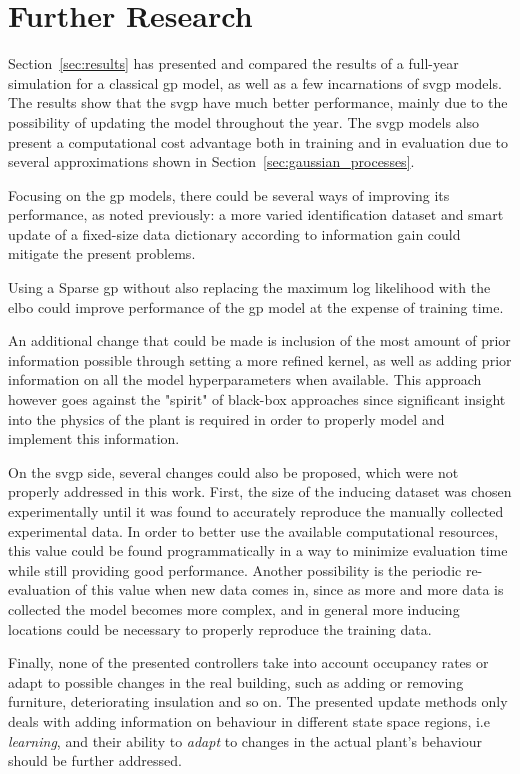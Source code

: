 \section{Further Research}

Section~\ref{sec:results} has presented and compared the results of a full-year
simulation for a classical \acrshort{gp} model, as well as a few incarnations of
\acrshort{svgp} models. The results show that the \acrshort{svgp} have much
better performance, mainly due to the possibility of updating the model
throughout the year. The \acrshort{svgp} models also present a computational
cost advantage both in training and in evaluation due to several approximations
shown in Section~\ref{sec:gaussian_processes}.

Focusing on the \acrlong{gp} models, there could be several ways of improving
its performance, as noted previously: a more varied identification dataset and
smart update of a fixed-size data dictionary according to information gain could
mitigate the present problems.

Using a Sparse \acrshort{gp} without also replacing the maximum log likelihood
with the \acrshort{elbo} could improve performance of the \acrshort{gp} model at
the expense of training time.

An additional change that could be made is inclusion of the most amount of prior
information possible through setting a more refined kernel, as well as adding
prior information on all the model hyperparameters when available. This approach
however goes against the "spirit" of black-box approaches since significant
insight into the physics of the plant is required in order to properly model and
implement this information.

On the \acrshort{svgp} side, several changes could also be proposed, which were
not properly addressed in this work. First, the size of the inducing dataset was
chosen experimentally until it was found to accurately reproduce the manually
collected experimental data. In order to better use the available computational
resources, this value could be found programmatically in a way to minimize
evaluation time while still providing good performance. Another possibility is
the periodic re-evaluation of this value when new data comes in, since as more
and more data is collected the model becomes more complex, and in general more
inducing locations could be necessary to properly reproduce the training data.

Finally, none of the presented controllers take into account occupancy rates or adapt to
possible changes in the real building, such as adding or removing furniture,
deteriorating insulation and so on. The presented update methods only deals with
adding information on behaviour in different state space regions, i.e
\textit{learning}, and their ability to \textit{adapt} to changes in the actual
plant's behaviour should be further addressed.
